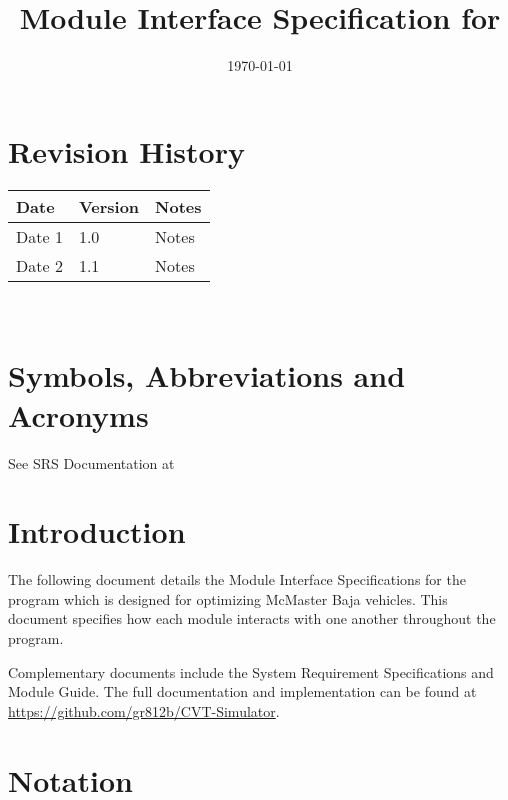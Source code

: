\documentclass[12pt, titlepage]{article}
\begin{document}
\title{Module Interface Specification for \progname{}}

\author{\authname}

\date{\today}

\maketitle


\section{Revision History}

\begin{tabularx}{\textwidth}{p{3cm}p{2cm}X}
\toprule {\bf Date} & {\bf Version} & {\bf Notes}\\
\midrule
Date 1 & 1.0 & Notes\\
Date 2 & 1.1 & Notes\\
\bottomrule
\end{tabularx}

~\newpage

\section{Symbols, Abbreviations and Acronyms}

See SRS Documentation at 


\newpage

\tableofcontents

\newpage


\section{Introduction}

The following document details the Module Interface Specifications for
the \progname program which is designed for optimizing McMaster Baja vehicles. 
This document specifies how each module interacts with one another throughout the program. 

Complementary documents include the System Requirement Specifications
and Module Guide.  The full documentation and implementation can be
found at \url{https://github.com/gr812b/CVT-Simulator}.

\section{Notation}
\end{document}
